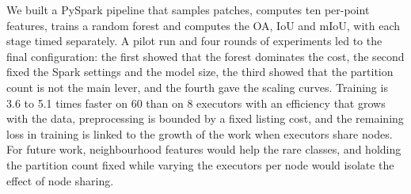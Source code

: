 \documentclass[a4paper, 11pt]{article} %
\begin{document}
We built a PySpark pipeline that samples patches, computes ten per-point features, trains a random forest and computes the OA, IoU and mIoU, with each stage timed separately. A pilot run and four rounds of experiments led to the final configuration: the first showed that the forest dominates the cost, the second fixed the Spark settings and the model size, the third showed that the partition count is not the main lever, and the fourth gave the scaling curves. Training is 3.6 to 5.1 times faster on 60 than on 8 executors with an efficiency that grows with the data, preprocessing is bounded by a fixed listing cost, and the remaining loss in training is linked to the growth of the work when executors share nodes. For future work, neighbourhood features would help the rare classes, and holding the partition count fixed while varying the executors per node would isolate the effect of node sharing.

\small


\end{document}
